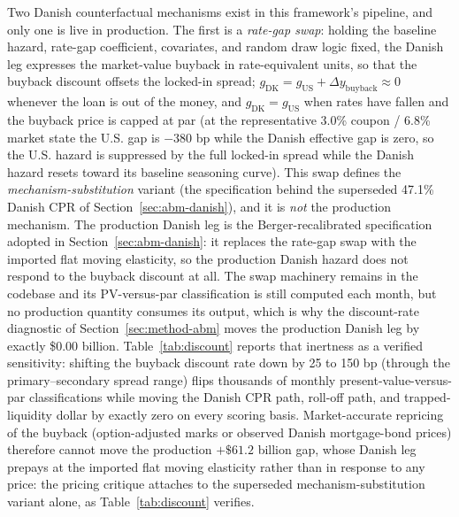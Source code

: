 \documentclass[12pt]{article}
\begin{document}
Two Danish counterfactual mechanisms exist in this framework's pipeline, and only one is live in production. The first is a \emph{rate-gap swap}: holding the baseline hazard, rate-gap coefficient, covariates, and random draw logic fixed, the Danish leg expresses the market-value buyback in rate-equivalent units, so that the buyback discount offsets the locked-in spread; $g_{\mathrm{DK}} = g_{\mathrm{US}} + \Delta y_{\mathrm{buyback}} \approx 0$ whenever the loan is out of the money, and $g_{\mathrm{DK}} = g_{\mathrm{US}}$ when rates have fallen and the buyback price is capped at par (at the representative 3.0\% coupon / 6.8\% market state the U.S. gap is $-380$ bp while the Danish effective gap is zero, so the U.S. hazard is suppressed by the full locked-in spread while the Danish hazard resets toward its baseline seasoning curve). This swap defines the \emph{mechanism-substitution} variant (the specification behind the superseded 47.1\% Danish CPR of Section~\ref{sec:abm-danish}), and it is \emph{not} the production mechanism. The production Danish leg is the Berger-recalibrated specification adopted in Section~\ref{sec:abm-danish}: it replaces the rate-gap swap with the imported flat moving elasticity, so the production Danish hazard does not respond to the buyback discount at all. The swap machinery remains in the codebase and its PV-versus-par classification is still computed each month, but no production quantity consumes its output, which is why the discount-rate diagnostic of Section~\ref{sec:method-abm} moves the production Danish leg by exactly \$0.00 billion. Table~\ref{tab:discount} reports that inertness as a verified sensitivity: shifting the buyback discount rate down by 25 to 150 bp (through the primary--secondary spread range) flips thousands of monthly present-value-versus-par classifications while moving the Danish CPR path, roll-off path, and trapped-liquidity dollar by exactly zero on every scoring basis. Market-accurate repricing of the buyback (option-adjusted marks or observed Danish mortgage-bond prices) therefore cannot move the production $+\$61.2$ billion gap, whose Danish leg prepays at the imported flat moving elasticity rather than in response to any price: the pricing critique attaches to the superseded mechanism-substitution variant alone, as Table~\ref{tab:discount} verifies.
\end{document}
